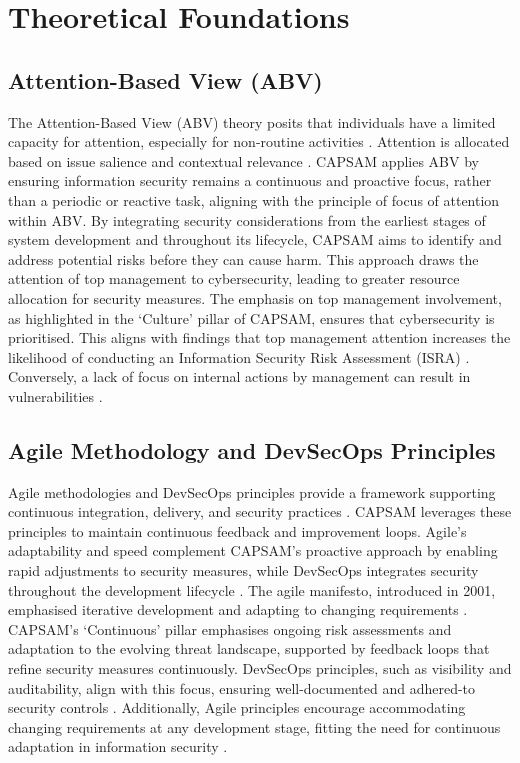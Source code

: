 \section{Theoretical Foundations}
    \subsection{Attention-Based View (ABV)}
    The Attention-Based View (ABV) theory posits that individuals have a limited capacity for attention, especially for non-routine activities \citep{shaikh2023information}. Attention is allocated based on issue salience and contextual relevance \citep{shaikh2023information}. CAPSAM applies ABV by ensuring information security remains a continuous and proactive focus, rather than a periodic or reactive task, aligning with the principle of focus of attention within ABV. By integrating security considerations from the earliest stages of system development and throughout its lifecycle, CAPSAM aims to identify and address potential risks before they can cause harm. This approach draws the attention of top management to cybersecurity, leading to greater resource allocation for security measures. The emphasis on top management involvement, as highlighted in the `Culture' pillar of CAPSAM, ensures that cybersecurity is prioritised. This aligns with findings that top management attention increases the likelihood of conducting an Information Security Risk Assessment (ISRA) \citep{shaikh2023information}. Conversely, a lack of focus on internal actions by management can result in vulnerabilities \citep{shaikh2023information}.
    
    \subsection{Agile Methodology and DevSecOps Principles}
    Agile methodologies and DevSecOps principles provide a framework supporting continuous integration, delivery, and security practices \citep{ibm2021devsecops,dingsoyr2012agile}. CAPSAM leverages these principles to maintain continuous feedback and improvement loops. Agile's adaptability and speed complement CAPSAM's proactive approach by enabling rapid adjustments to security measures, while DevSecOps integrates security throughout the development lifecycle \citep{ibm2021devsecops}. The agile manifesto, introduced in 2001, emphasised iterative development and adapting to changing requirements \citep{dingsoyr2012agile}. CAPSAM's `Continuous' pillar emphasises ongoing risk assessments and adaptation to the evolving threat landscape, supported by feedback loops that refine security measures continuously. DevSecOps principles, such as visibility and auditability, align with this focus, ensuring well-documented and adhered-to security controls \citep{ibm2021devsecops}. Additionally, Agile principles encourage accommodating changing requirements at any development stage, fitting the need for continuous adaptation in information security \citep{dingsoyr2012agile}.
    
